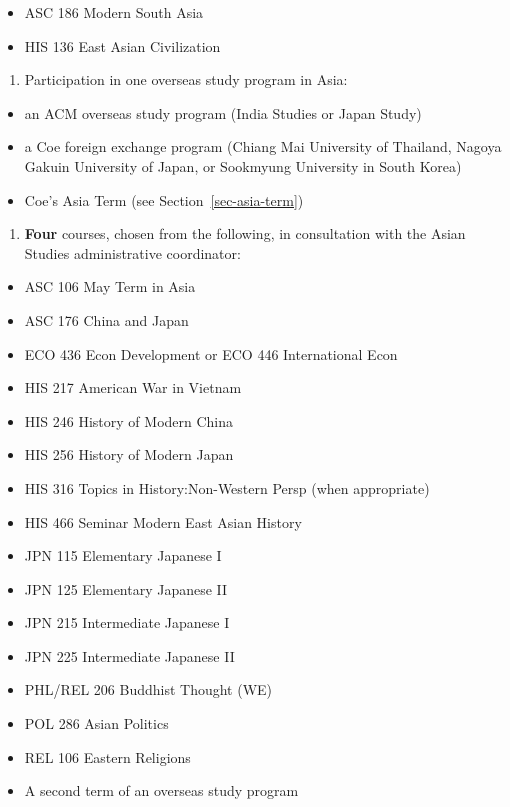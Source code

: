 \documentclass[
  letterpaper,
]{scrbook}
\providecommand{\tightlist}{%
  \setlength{\itemsep}{0pt}\setlength{\parskip}{0pt}}
\begin{document}
\begin{itemize}
\tightlist
\item
  ASC 186 Modern South Asia
\item
  HIS 136 East Asian Civilization
\end{itemize}

\begin{enumerate}
\def\labelenumi{\arabic{enumi}.}
\setcounter{enumi}{1}
\tightlist
\item
  Participation in one overseas study program in Asia:
\end{enumerate}

\begin{itemize}
\tightlist
\item
  an ACM overseas study program (India Studies or Japan Study)
\item
  a Coe foreign exchange program (Chiang Mai University of Thailand,
  Nagoya Gakuin University of Japan, or Sookmyung University in South
  Korea)
\item
  Coe's Asia Term (see Section~\ref{sec-asia-term})
\end{itemize}

\begin{enumerate}
\def\labelenumi{\arabic{enumi}.}
\setcounter{enumi}{2}
\tightlist
\item
  \textbf{Four} courses, chosen from the following, in consultation with
  the Asian Studies administrative coordinator:
\end{enumerate}

\begin{itemize}
\tightlist
\item
  ASC 106 May Term in Asia
\item
  ASC 176 China and Japan
\item
  ECO 436 Econ Development or ECO 446 International Econ
\item
  HIS 217 American War in Vietnam
\item
  HIS 246 History of Modern China
\item
  HIS 256 History of Modern Japan
\item
  HIS 316 Topics in History:Non-Western Persp (when appropriate)
\item
  HIS 466 Seminar Modern East Asian History
\item
  JPN 115 Elementary Japanese I
\item
  JPN 125 Elementary Japanese II
\item
  JPN 215 Intermediate Japanese I
\item
  JPN 225 Intermediate Japanese II
\item
  PHL/REL 206 Buddhist Thought (WE)
\item
  POL 286 Asian Politics
\item
  REL 106 Eastern Religions
\item
  A second term of an overseas study program
\end{itemize}
\end{document}
